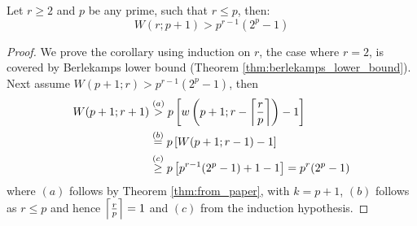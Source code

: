 \newpage
\begin{corollary}
	Let $r \geq 2$ and $p$ be any prime, such that $r \leq p$, then:
	\begin{equation*}
		W(r; p + 1) > p^{r - 1}(2^{p} - 1)
	\end{equation*}
\end{corollary}
\begin{proof}
	We prove the corollary using induction on $r$, the case where $r = 2$, is covered by Berlekamps lower bound (Theorem \ref{thm:berlekamps_lower_bound}). Next assume $W(p + 1; r) > p^{r - 1}(2^{p} - 1)$, then
	\begin{align*}
		W(p + 1; r + 1) & \stackrel{(a)}{>}p \left[w\left(p + 1; r - \left\lceil\frac{r}{p}\right\rceil\right) - 1\right]  \\
		                & \stackrel{(b)}{=} p \left[W(p + 1; r - 1) - 1\right]                             \\
		                & \stackrel{(c)}{\geq} p \left[p^{r - 1}(2^{p} - 1) + 1 - 1\right] = p^r (2^p - 1)
	\end{align*}
	where $(a)$ follows by Theorem \ref{thm:from_paper}, with $k = p + 1$, $(b)$ follows as $r \leq p$ and hence $\left\lceil\frac{r}{p}\right\rceil = 1$ and $(c)$ from the induction hypothesis.
\end{proof}
